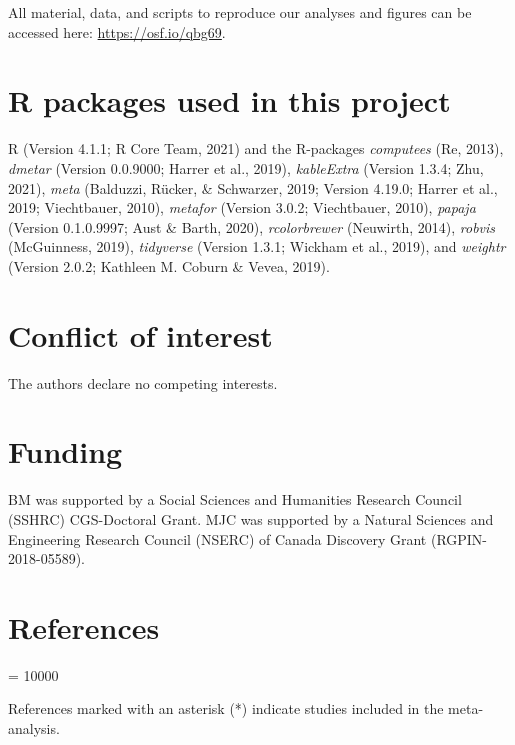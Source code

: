 \documentclass[
  english,
  man,floatsintext]{apa7}
\begin{document}
\label{sec:sharing}
All material, data, and scripts to reproduce our analyses and figures can be accessed here: \url{https://osf.io/qbg69}.

\hypertarget{r-packages-used-in-this-project}{%
\section{R packages used in this project}\label{r-packages-used-in-this-project}}

R (Version 4.1.1; R Core Team, 2021) and the R-packages \emph{computees} (Re, 2013), \emph{dmetar} (Version 0.0.9000; Harrer et al., 2019), \emph{kableExtra} (Version 1.3.4; Zhu, 2021), \emph{meta} (Balduzzi, Rücker, \& Schwarzer, 2019; Version 4.19.0; Harrer et al., 2019; Viechtbauer, 2010), \emph{metafor} (Version 3.0.2; Viechtbauer, 2010), \emph{papaja} (Version 0.1.0.9997; Aust \& Barth, 2020), \emph{rcolorbrewer} (Neuwirth, 2014), \emph{robvis} (McGuinness, 2019), \emph{tidyverse} (Version 1.3.1; Wickham et al., 2019), and \emph{weightr} (Version 2.0.2; Kathleen M. Coburn \& Vevea, 2019).

\hypertarget{conflict-of-interest}{%
\section{Conflict of interest}\label{conflict-of-interest}}

The authors declare no competing interests.

\hypertarget{funding}{%
\section{Funding}\label{funding}}

BM was supported by a Social Sciences and Humanities Research Council (SSHRC) CGS-Doctoral Grant. MJC was supported by a Natural Sciences and Engineering Research Council (NSERC) of Canada Discovery Grant (RGPIN-2018-05589).

\hypertarget{references}{%
\section{References}\label{references}}

\begingroup
\interlinepenalty = 10000
\setlength{\parindent}{-0.5in}
\setlength{\leftskip}{0.5in}

References marked with an asterisk (*) indicate studies included in the meta-analysis.

\endgroup
\end{document}
